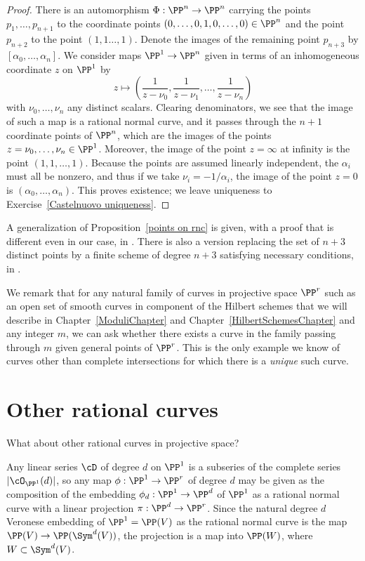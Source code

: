 \begin{proof}
There is an automorphism $\Phi : \PP^n \to \PP^n$ carrying the points $p_1,\dots,p_{n+1}$ to the coordinate points $(0,\dots,0,1,0,\dots,0)\in \PP^n$ and the point $p_{n+2}$ to the point $(1,1\dots,1)$.  Denote the images of the remaining  point $p_{n+3}$  by $[\alpha_0,\dots,\alpha_n]$. We consider maps $\PP^1 \to \PP^n$ given in terms of an inhomogeneous coordinate $z$ on $\PP^1$ by
$$
z \mapsto \left( \frac{1}{z - \nu_0}, \frac{1}{z - \nu_1} , \dots, \frac{1}{z - \nu_n}  \right)
$$
with $\nu_0,\dots,\nu_n$ any distinct scalars. Clearing denominators, we see that the image of such a map is a rational normal curve, and it passes through the $n+1$ coordinate points of $\PP^n$, which are the images of the points $z = \nu_0, \dots, \nu_n \in \PP^1$. Moreover, the image of the point $z = \infty$ at infinity is the point $(1,1, \dots,1)$. Because the points are assumed linearly independent, the $\alpha_i$ must all be nonzero, and thus if we take  $\nu_i = -1/\alpha_i$, the image of the point $z = 0$ is $(\alpha_0,\dots,\alpha_n)$. This proves existence; we leave uniqueness to Exercise~\ref{Castelnuovo uniqueness}. 
\end{proof}

\begin{fact}
A generalization of Proposition~\ref{points on rnc} is given, with a proof that is different
even in our case, in \cite[Proposition 3.19]{Montreal}.  There is also a version replacing the set of $n+3$ distinct points by a  finite
scheme of degree $n+3$ satisfying necessary conditions, in \cite{EHLGP}.
\end{fact}

We remark that for any natural family of curves in projective space $\PP^r$ such as an open set of smooth
curves in component of the Hilbert schemes that we will describe in Chapter~\ref{ModuliChapter} and Chapter~\ref{HilbertSchemesChapter} and any integer $m$, we can ask whether there exists a curve in the family passing through $m$ given general points of $\PP^r$. This is the only example we know of curves other than complete intersections for which there is a \emph{unique} such curve.


\section{Other rational curves}

What about other rational curves in projective space? 

Any linear series $\cD$ of degree $d$ on $\PP^1$ is a subseries of the complete series $|\cO_{\PP^1}(d)|$, so any map $\phi : \PP^1 \to \PP^r$ of degree $d$ may be given as the
composition of the embedding $\phi_d : \PP^1 \to \PP^d$ of $\PP^1$ as a rational normal curve with a linear projection $\pi : \PP^d \to \PP^r$. Since the natural degree $d$ Veronese embedding of $\PP^1 = \PP(V)$ as the rational normal curve is the map
$\PP(V) \to \PP(\Sym^d(V))$, the projection is a map into $\PP(W)$, where $W\subset \Sym^d(V)$. 

